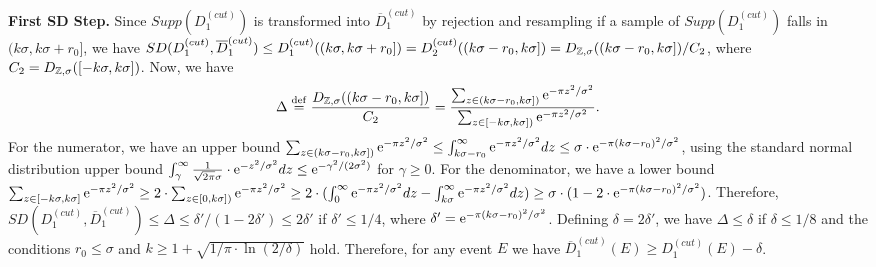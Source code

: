 \begin{sloppypar}
\textbf{First SD Step.} Since $Supp(D_1^{(cut)})$ is transformed into $\overline{D}_1^{(cut)}$ by rejection and resampling if a sample of $Supp(D_1^{(cut)})$ falls in $(k\sigma,k\sigma+r_0]$, we have $SD(D_1^{(cut)}, \overline{D}_1^{(cut)}) \leq D_1^{(cut)}((k\sigma,k\sigma+r_0]) = D_2^{(cut)}((k\sigma-r_0,k\sigma]) = D_{\mathbb{Z},\sigma}((k\sigma-r_0,k\sigma])/C_2$, where $C_2 = D_{\mathbb{Z},\sigma}([-k\sigma,k\sigma])$. Now, we have
$$
\Delta \stackrel{\mathrm{def}}{=} \frac{D_{\mathbb{Z},\sigma}((k\sigma-r_0,k\sigma])}{C_2} = \frac{\sum_{z \in (k\sigma-r_0,k\sigma])} \mathrm{e}^{-\pi z^2/\sigma^2}}{\sum_{z \in [-k\sigma,k\sigma])} \mathrm{e}^{-\pi z^2/\sigma^2}}.
$$
For the numerator, we have an upper bound $\sum_{z \in (k\sigma-r_0,k\sigma])} \mathrm{e}^{-\pi z^2/\sigma^2} \leq \int^{\infty}_{k\sigma-r_0} \mathrm{e}^{-\pi z^2/\sigma^2} dz \leq \sigma \cdot \mathrm{e}^{-\pi (k\sigma-r_0)^2/\sigma^2}$, using the standard normal distribution upper bound $\int^{\infty}_{\gamma} \frac{1}{\sqrt{2\pi} \sigma} \cdot \mathrm{e}^{- z^2/\sigma^2} dz \leq \mathrm{e}^{-\gamma^2/(2\sigma^2)}$ for $\gamma \geq 0$. For the denominator, we have a lower bound $\sum_{z \in [-k\sigma,k\sigma]} \mathrm{e}^{-\pi z^2/\sigma^2} \geq 2 \cdot \sum_{z \in [0,k\sigma])} \mathrm{e}^{-\pi z^2/\sigma^2} \geq 2 \cdot (\int^{\infty}_{0} \mathrm{e}^{-\pi z^2/\sigma^2} dz - \int^{\infty}_{k\sigma} \mathrm{e}^{-\pi z^2/\sigma^2} dz) \geq \sigma \cdot (1 - 2 \cdot \mathrm{e}^{-\pi (k\sigma-r_0)^2/\sigma^2})$. Therefore, $SD(D_1^{(cut)}, \overline{D}_1^{(cut)}) \leq \Delta \leq \delta' / (1-2\delta') \leq 2\delta'$ if $\delta' \leq 1/4$, where $\delta' = \mathrm{e}^{-\pi (k\sigma-r_0)^2/\sigma^2}$. Defining $\delta = 2\delta'$, we have $\Delta \leq \delta$ if $\delta \leq 1/8$ and the conditions $r_0 \leq \sigma$ and $k \geq 1 + \sqrt{1/\pi \cdot \ln(2/\delta)}$ hold. Therefore, for any event $E$ we have $\overline{D}_1^{(cut)}(E) \geq D_1^{(cut)}(E) - \delta$.
\end{sloppypar}

